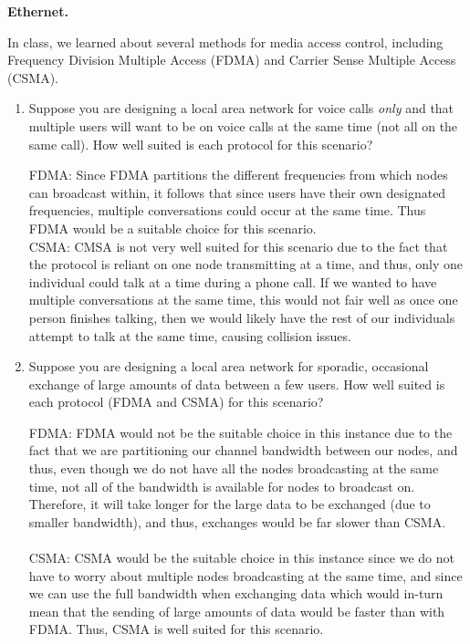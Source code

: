 \documentclass[10pt]{article}
\newenvironment{problem}[2][]{\begin{trivlist}
\item[\hskip \labelsep {\bfseries #1}\hskip \labelsep {\bfseries #2.}]}{\end{trivlist}}
\begin{document}
\newpage
\textbf{Ethernet.}
\begin{problem}{1: Comparing Media Access Control methods}
\item In class, we learned about several methods for media access control, including Frequency Division Multiple Access (FDMA) and Carrier Sense Multiple Access (CSMA). 

\begin{enumerate}[label=(\alph*)]
 \item Suppose you are designing a local area network for voice calls \emph{only} and that multiple users will want to be on voice calls at the same time (not all on the same call). How well suited is each protocol for this scenario?
 
 FDMA: Since FDMA partitions the different frequencies from which nodes can broadcast within, it follows that since users have their own designated frequencies, multiple conversations could occur at the same time. Thus FDMA would be a suitable choice for this scenario.\\
 
 CSMA: CMSA is not very well suited for this scenario due to the fact that the protocol is reliant on one node transmitting at a time, and thus, only one individual could talk at a time during a phone call. If we wanted to have multiple conversations at the same time,
 this would not fair well as once one person finishes talking, then we would likely have the rest of our individuals attempt to talk at the same time, causing collision issues.\\
 

 \item Suppose you are designing a local area network for sporadic, occasional exchange of large amounts of data between a few users. How well suited is each protocol (FDMA and CSMA) for this scenario?
 
 FDMA: FDMA would not be the suitable choice in this instance due to the fact that we are partitioning our channel bandwidth between our nodes, and thus, even though we do not have all the nodes broadcasting at the same time, not all of the bandwidth is available for nodes to broadcast on. Therefore,
 it will take longer for the large data to be exchanged (due to smaller bandwidth), and thus, exchanges would be far slower than CSMA.\\\\
 
 CSMA: CSMA would be the suitable choice in this instance since we do not have to worry about multiple nodes broadcasting at the same time, and since we can use the full bandwidth when exchanging data which would in-turn mean that the sending of large amounts of data would be faster than with FDMA. Thus, CSMA is well suited for this scenario.\\
 

\end{enumerate}
\end{problem}
\end{document}
